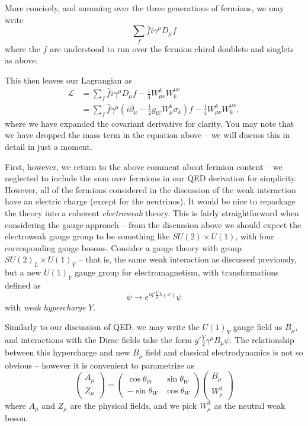 More concisely, and summing over the three generations of fermions, we may write
\begin{equation}
\sum\limits_{f} \bar{f}i\gamma^{\mu}D_{\mu}f
\end{equation}
where the $f$ are understood to run over the fermion chiral doublets and singlets as above.

This then leaves our Lagrangian as
\begin{align}
\mathcal{L} &= \sum\limits_{f} \bar{f}i\gamma^{\mu}D_{\mu}f -\frac{1}{4} W_{\mu\nu}^{k}W^{\mu\nu}_{k}\\
&= \sum\limits_{f} \bar{f}\gamma^{\mu}(i\partial_{\mu} -\frac{1}{2}g_{W}W_{\mu}^{k}\sigma_{k})f -\frac{1}{4} W_{\mu\nu}^{k}W^{\mu\nu}_{k},
\end{align}
where we have expanded the covariant derivative for clarity. You may note that we have dropped the mass term in the equation 
above -- we will discuss this in detail in just a moment. 


First, however, we return to the above comment about fermion content -- we neglected to include the sum over fermions
in our QED derivation for simplicity. However, all of the fermions considered in the discussion of the weak 
interaction have an electric charge (except for the neutrinos). It would be nice to repackage the theory into a coherent
\emph{electroweak} theory. This is fairly straightforward when considering the gauge approach -- from the discussion 
above we should expect the electroweak gauge group to be something like $SU(2) \times U(1)$, with four corresponding gauge bosons. 
Consider a gauge theory with group $SU(2)_L \times U(1)_{Y}$ -- that is, the same weak interaction as discussed 
previously, but a new $U(1)_{Y}$ gauge group for electromagnetism, with transformations defined as
\begin{equation}
\psi\rightarrow e^{ig'\frac{Y}{2}\lambda(x)}\psi
\end{equation}
with \emph{weak hypercharge} $Y$.

Similarly to our discussion of QED, we may write the $U(1)_{Y}$ gauge field as $B_{\mu}$, and interactions with 
the Dirac fields take the form $g'\frac{Y}{2}\gamma^{\mu}B_{\mu}\psi$. The relationship between this hypercharge 
and new $B_{\mu}$ field and classical electrodynamics is not so obvious -- however it is convenient to parametrize
as 
\begin{equation}
\begin{pmatrix}A_{\mu}\\Z_{\mu}\end{pmatrix} = 
\begin{pmatrix}\cos\theta_{W} & \sin\theta_{W}\\-\sin\theta_{W} & \cos\theta_{W}\end{pmatrix}
\begin{pmatrix}B_{\mu}\\W_{\mu}^{3}\end{pmatrix}
\end{equation}
where $A_{\mu}$ and $Z_{\mu}$ are the physical fields, and we pick $W_{\mu}^{3}$ as the neutral weak boson.

